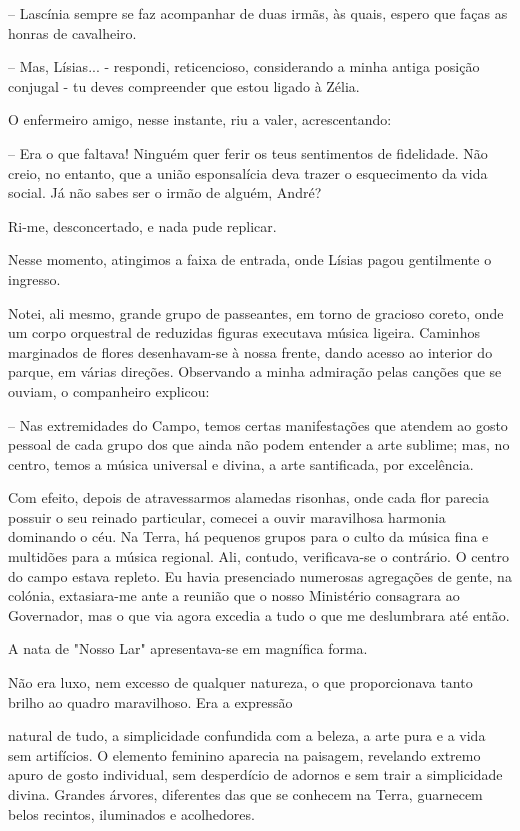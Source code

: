 \documentclass[portuguese,12pt,a4paper]{scrbook}
\begin{document}
	– Lascínia sempre se faz acompanhar de duas irmãs, às quais, espero que faças as honras de cavalheiro.
	
	– Mas, Lísias... - respondi, reticencioso, considerando a minha antiga posição conjugal - tu deves compreender que estou ligado à Zélia.
	
	
	O enfermeiro amigo, nesse instante, riu a valer, acrescentando:
	
	– Era o que faltava! Ninguém quer ferir os teus sentimentos de fidelidade. Não creio, no entanto, que a união esponsalícia deva trazer o esquecimento da vida social. Já não sabes ser o irmão de alguém, André?
	
	Ri-me, desconcertado, e nada pude replicar.
	
	Nesse momento, atingimos a faixa de entrada, onde Lísias pagou gentilmente o ingresso.
	
	Notei, ali mesmo, grande grupo de passeantes, em torno de gracioso coreto, onde um corpo orquestral de reduzidas figuras executava música ligeira. Caminhos marginados de flores desenhavam-se à nossa frente, dando acesso ao interior do parque, em várias direções. Observando a minha admiração pelas canções que se ouviam, o companheiro explicou:
	
	– Nas extremidades do Campo, temos certas manifestações que atendem ao gosto pessoal de cada grupo dos que ainda não podem entender a arte sublime; mas, no centro, temos a música universal e divina, a arte santificada, por excelência.
	
	Com efeito, depois de atravessarmos alamedas risonhas, onde cada flor parecia possuir o seu reinado particular, comecei a ouvir maravilhosa harmonia dominando o céu. Na Terra, há pequenos grupos para o culto da música fina e multidões para a música regional. Ali, contudo, verificava-se o contrário. O centro do campo estava repleto. Eu havia presenciado numerosas agregações de gente, na colónia, extasiara-me ante a reunião que o nosso Ministério consagrara ao Governador, mas o que via agora excedia a tudo o que me deslumbrara até então.
	
	A nata de "Nosso Lar" apresentava-se em magnífica forma.
	
	Não era luxo, nem excesso de qualquer natureza, o que proporcionava tanto brilho ao quadro maravilhoso. Era a expressão
	
	
	natural de tudo, a simplicidade confundida com a beleza, a arte pura e a vida sem artifícios. O elemento feminino aparecia na paisagem, revelando extremo apuro de gosto individual, sem desperdício de adornos e sem trair a simplicidade divina. Grandes árvores, diferentes das que se conhecem na Terra, guarnecem belos recintos, iluminados e acolhedores.
	
\end{document}
